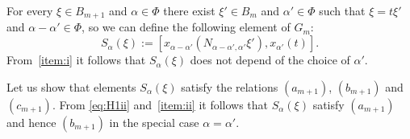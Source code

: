 \documentclass[oneside, 10pt]{amsart}
\newcommand{\rA}{\mathsf{A}}
\numberwithin{equation}{section}
\newtheorem{lemma}{Lemma}
\numberwithin{lemma}{section}
\theoremstyle{definition}
\theoremstyle{remark}
\begin{document}
For every $\xi \in B_{m+1}$ and $\alpha\in \Phi$ there exist $\xi' \in B_m$ and $\alpha'\in \Phi$ such that $\xi = t\xi'$ and $\alpha-\alpha'\in\Phi$,
so we can define the following element of $G_m$:
\begin{equation} \label{eq:defmpn} S_\alpha(\xi) := [x_{\alpha-\alpha'}(N_{\alpha-\alpha',\alpha'} \xi'), x_{\alpha'}(t)].\end{equation} 
From~\eqref{item:i} it follows that $S_\alpha(\xi)$ does not depend of the choice of $\alpha'$.


Let us show that elements $S_\alpha(\xi)$ satisfy the relations $(a_{m+1})$, $(b_{m+1})$ and $(c_{m+1})$.
From \eqref{eq:H1ii} and~\eqref{item:ii} it follows that $S_\alpha(\xi)$  satisfy $(a_{m+1})$ and hence $(b_{m+1})$ in the special case $\alpha=\alpha'$.
\begin{comment}
\begin{lemma} For every $\rA_3$-triple $(\alpha, \beta, \gamma)$ in $\Phi$ and $a,b,c \in A$ the following relation holds in $G_1$:
\begin{align} 
 [x_{\alpha}(a), [x_{\beta}(b t), x_{\gamma}(c t)]] & = [x_{\beta+\alpha}(N_{\beta, \alpha}a b t), x_{\gamma}(ct)].
\end{align}
 \end{lemma}
\begin{proof}
 \begin{align*}
   [x_{\alpha}(a), [x_{\beta}(b t), x_{\gamma}(c t)]] = [[x_{\alpha}(a), x_{\beta}(b t)], {}^{x_{\beta}(b t)}\!x_{\gamma}(ct)] &  \text{ by~\eqref{eq:H1iii} and~$(b_1)$} \\ 
                                                       = {}^{x_{\beta}(b t)}[x_{\alpha +\beta}(N_{\alpha,\beta}abt), x_{\gamma}(ct) ] & \text{ by $(b_1)$ and $(c_1)$}\\ 
                                                       = [x_{\alpha +\beta}(N_{\alpha,\beta}abt), x_{\gamma}(ct)] & \text{ by $(d_1)$. \qedhere}
 \end{align*}  
\end{proof}
\end{comment}
\end{document}
